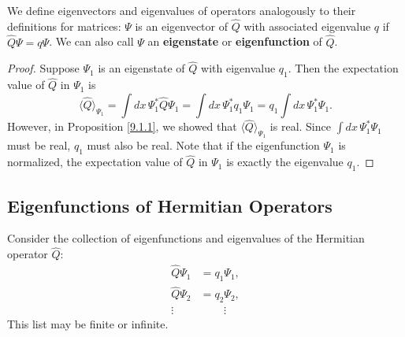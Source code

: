 We define eigenvectors and eigenvalues of operators analogously to their definitions for matrices: $\Psi$ is an eigenvector of $\hat{Q}$ with associated eigenvalue $q$ if $\hat{Q}\Psi=q\Psi$. We can also call $\Psi$ an \textbf{eigenstate} or \textbf{eigenfunction} of $\hat{Q}$.

\begin{framedprop}\label{9.1.2}
    \begin{proof}Suppose $\Psi_1$ is an eigenstate of $\hat{Q}$ with eigenvalue $q_1$. Then the expectation value of $\hat{Q}$ in $\Psi_1$ is $$\langle\hat{Q}\rangle_{\Psi_1}=\int dx\,\Psi_1^*\hat{Q}\Psi_1=\int dx\,\Psi_1^*q_1\Psi_1=q_1\int dx\,\Psi_1^*\Psi_1.$$However, in Proposition \ref{9.1.1}, we showed that $\langle\hat{Q}\rangle_{\Psi_1}$ is real. Since $\int dx\,\Psi_1^*\Psi_1$ must be real, $q_1$ must also be real. Note that if the eigenfunction $\Psi_1$ is normalized, the expectation value of $\hat{Q}$ in $\Psi_1$ is exactly the eigenvalue $q_1$.\end{proof}
\end{framedprop}

\subsection{Eigenfunctions of Hermitian Operators}\label{eigenfunctions}

Consider the collection of eigenfunctions and eigenvalues of the Hermitian operator $\hat{Q}$: \begin{align*}\hat{Q}\Psi_1&=q_1\Psi_1,\\\hat{Q}\Psi_2&=q_2\Psi_2,\\\vdots\quad&\qquad\,\vdots\end{align*}This list may be finite or infinite.

